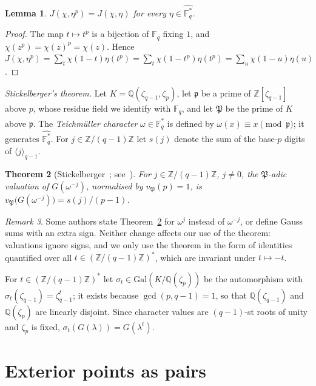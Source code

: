 \documentclass[11pt]{amsart}
\newtheorem{theorem}{Theorem}[section]
\newtheorem{lemma}[theorem]{Lemma}
\theoremstyle{definition}
\theoremstyle{remark}
\newtheorem{remark}[theorem]{Remark}
\numberwithin{equation}{section}
\newcommand{\F}{\mathbb{F}_q}
\newcommand{\Fs}{\mathbb{F}_q^{*}}
\newcommand{\Z}{\mathbb{Z}}
\newcommand{\Q}{\mathbb{Q}}
\newcommand{\res}[2]{\langle #1\rangle_{#2}}
\begin{document}
\begin{lemma}\label{lem:frob}
$J(\chi,\eta^p)=J(\chi,\eta)$ for every $\eta\in\widehat{\Fs}$.
\end{lemma}
\begin{proof}
The map $t\mapsto t^p$ is a bijection of $\F$ fixing $1$, and $\chi(z^p)=\chi(z)^p=\chi(z)$. Hence
$J(\chi,\eta^p)=\sum_t\chi(1-t)\eta(t^p)=\sum_t\chi(1-t^p)\eta(t^p)=\sum_u\chi(1-u)\eta(u)$.
\end{proof}

\emph{Stickelberger's theorem.} Let $K=\Q(\zeta_{q-1},\zeta_p)$, let $\mathfrak p$ be a prime of $\Z[\zeta_{q-1}]$ above $p$, whose
residue field we identify with $\F$, and let $\mathfrak P$ be the prime of $K$ above $\mathfrak p$. The \emph{Teichmüller
character} $\omega\in\widehat{\Fs}$ is defined by $\omega(x)\equiv x\pmod{\mathfrak p}$; it generates $\widehat{\Fs}$. For
$j\in\Z/(q-1)\Z$ let $s(j)$ denote the sum of the base-$p$ digits of $\res{j}{q-1}$.

\begin{theorem}[Stickelberger~\cite{Stickelberger}; see~{\cite[Chapter~6]{Washington}}]\label{thm:stickelberger}
For $j\in\Z/(q-1)\Z$, $j\ne0$, the $\mathfrak P$-adic valuation of $G(\omega^{-j})$, normalised by $v_{\mathfrak P}(p)=1$, is
$v_{\mathfrak P}\bigl(G(\omega^{-j})\bigr)=s(j)/(p-1)$.
\end{theorem}

\begin{remark}\label{rem:convention}
Some authors state Theorem~\ref{thm:stickelberger} for $\omega^{j}$ instead of $\omega^{-j}$, or define Gauss sums with an extra
sign. Neither change affects our use of the theorem: valuations ignore signs, and we only use the theorem in the form of
identities quantified over all $t\in(\Z/(q-1)\Z)^*$, which are invariant under $t\mapsto-t$.
\end{remark}

For $t\in(\Z/(q-1)\Z)^*$ let $\sigma_t\in\mathrm{Gal}(K/\Q(\zeta_p))$ be the automorphism with $\sigma_t(\zeta_{q-1})=\zeta_{q-1}^t$; it
exists because $\gcd(p,q-1)=1$, so that $\Q(\zeta_{q-1})$ and $\Q(\zeta_p)$ are linearly disjoint. Since character values are
$(q-1)$-st roots of unity and $\zeta_p$ is fixed, $\sigma_t(G(\lambda))=G(\lambda^t)$.

\section{Exterior points as pairs}\label{sec:forms}
\end{document}
